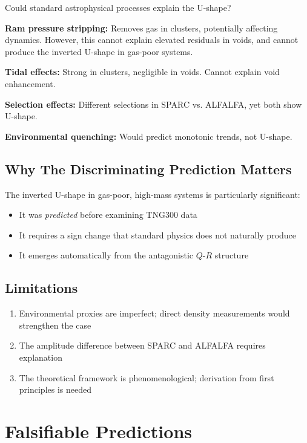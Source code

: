 \documentclass[12pt,a4paper]{article}
\begin{document}
Could standard astrophysical processes explain the U-shape?

\textbf{Ram pressure stripping:} Removes gas in clusters, potentially affecting dynamics. However, this cannot explain elevated residuals in voids, and cannot produce the inverted U-shape in gas-poor systems.

\textbf{Tidal effects:} Strong in clusters, negligible in voids. Cannot explain void enhancement.

\textbf{Selection effects:} Different selections in SPARC vs. ALFALFA, yet both show U-shape.

\textbf{Environmental quenching:} Would predict monotonic trends, not U-shape.

\subsection{Why The Discriminating Prediction Matters}

The inverted U-shape in gas-poor, high-mass systems is particularly significant:
\begin{itemize}
    \item It was \textit{predicted} before examining TNG300 data
    \item It requires a sign change that standard physics does not naturally produce
    \item It emerges automatically from the antagonistic $Q$-$R$ structure
\end{itemize}

\subsection{Limitations}

\begin{enumerate}
    \item Environmental proxies are imperfect; direct density measurements would strengthen the case
    \item The amplitude difference between SPARC and ALFALFA requires explanation
    \item The theoretical framework is phenomenological; derivation from first principles is needed
\end{enumerate}

\section{Falsifiable Predictions}
\label{sec:predictions}
\end{document}
